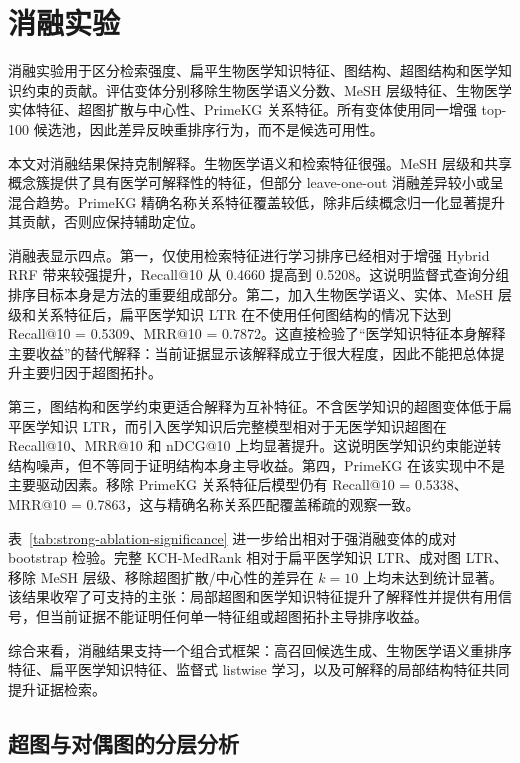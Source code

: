 \section{消融实验}

消融实验用于区分检索强度、扁平生物医学知识特征、图结构、超图结构和医学知识约束的贡献。评估变体分别移除生物医学语义分数、MeSH 层级特征、生物医学实体特征、超图扩散与中心性、PrimeKG 关系特征。所有变体使用同一增强 top-100 候选池，因此差异反映重排序行为，而不是候选可用性。

本文对消融结果保持克制解释。生物医学语义和检索特征很强。MeSH 层级和共享概念簇提供了具有医学可解释性的特征，但部分 leave-one-out 消融差异较小或呈混合趋势。PrimeKG 精确名称关系特征覆盖较低，除非后续概念归一化显著提升其贡献，否则应保持辅助定位。



消融表显示四点。第一，仅使用检索特征进行学习排序已经相对于增强 Hybrid RRF 带来较强提升，Recall@10 从 0.4660 提高到 0.5208。这说明监督式查询分组排序目标本身是方法的重要组成部分。第二，加入生物医学语义、实体、MeSH 层级和关系特征后，扁平医学知识 LTR 在不使用任何图结构的情况下达到 Recall@10 = 0.5309、MRR@10 = 0.7872。这直接检验了“医学知识特征本身解释主要收益”的替代解释：当前证据显示该解释成立于很大程度，因此不能把总体提升主要归因于超图拓扑。

第三，图结构和医学约束更适合解释为互补特征。不含医学知识的超图变体低于扁平医学知识 LTR，而引入医学知识后完整模型相对于无医学知识超图在 Recall@10、MRR@10 和 nDCG@10 上均显著提升。这说明医学知识约束能逆转结构噪声，但不等同于证明结构本身主导收益。第四，PrimeKG 在该实现中不是主要驱动因素。移除 PrimeKG 关系特征后模型仍有 Recall@10 = 0.5338、MRR@10 = 0.7863，这与精确名称关系匹配覆盖稀疏的观察一致。

表~\ref{tab:strong-ablation-significance} 进一步给出相对于强消融变体的成对 bootstrap 检验。完整 KCH-MedRank 相对于扁平医学知识 LTR、成对图 LTR、移除 MeSH 层级、移除超图扩散/中心性的差异在 $k{=}10$ 上均未达到统计显著。该结果收窄了可支持的主张：局部超图和医学知识特征提升了解释性并提供有用信号，但当前证据不能证明任何单一特征组或超图拓扑主导排序收益。





综合来看，消融结果支持一个组合式框架：高召回候选生成、生物医学语义重排序特征、扁平医学知识特征、监督式 listwise 学习，以及可解释的局部结构特征共同提升证据检索。

\subsection{超图与对偶图的分层分析}

